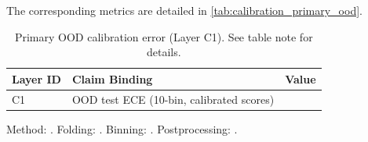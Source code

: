 

The corresponding metrics are detailed in \autoref{tab:calibration_primary_ood}.

\begin{table}[H]
\centering
\caption[Primary OOD Calibration Error]{Primary OOD calibration error (Layer C1). See table note for details.}
\label{tab:calibration_primary_ood}
\renewcommand{\arraystretch}{1.2}
\begin{tabular}{lll}
\toprule
\textbf{Layer ID} & \textbf{Claim Binding} & \textbf{Value} \\
\midrule
C1 & OOD test ECE (10-bin, calibrated scores) & \textbf{\metricECEOODBootstrapCalibrated{}} \\
\bottomrule
\end{tabular}
\vspace{0.5em}
\begin{minipage}{0.95\linewidth}
\footnotesize Method: \metricCalibrationPrimaryMethod{}. Folding: \metricCalibrationPrimaryFolding{}. Binning: \metricCalibrationPrimaryBinning{}. Postprocessing: \metricCalibrationPrimaryPostprocess{}.
\end{minipage}
\end{table}
